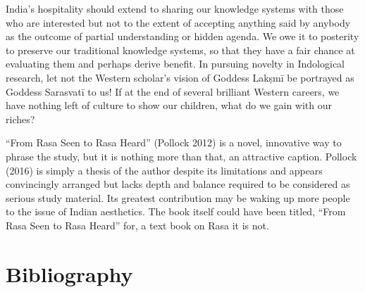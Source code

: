 India’s hospitality should extend to sharing our knowledge systems with those who are interested but not to the extent of accepting anything said by anybody as the outcome of partial understanding or hidden agenda. We owe it to posterity to preserve our traditional knowledge systems, so that they have a fair chance at evaluating them and perhaps derive benefit. In pursuing novelty in Indological research, let not the Western scholar’s vision of Goddess Lakṣmī be portrayed as Goddess Sarasvatī to us! If at the end of several brilliant Western careers, we have nothing left of culture to show our children, what do we gain with our riches?

“From Rasa Seen to Rasa Heard” (Pollock 2012) is a novel, innovative way to phrase the study, but it is nothing more than that, an attractive caption. Pollock (2016) is simply a thesis of the author despite its limitations and appears convincingly arranged but lacks depth and balance required to be considered as serious study material. Its greatest contribution may be waking up more people to the issue of Indian aesthetics. The book itself could have been titled, “From Rasa Seen to Rasa Heard” for, a text book on Rasa it is not.


\section*{Bibliography}

